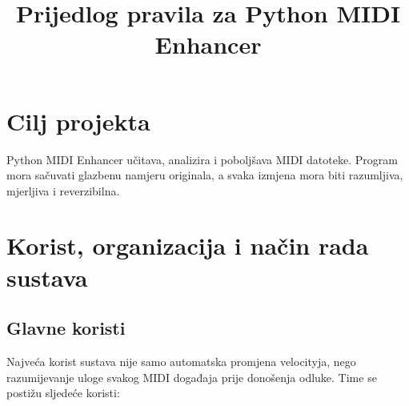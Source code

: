 \documentclass[11pt]{article}
\title{Prijedlog pravila za Python MIDI Enhancer}
\author{}
\date{}
\begin{document}
\maketitle

\section{Cilj projekta}

Python MIDI Enhancer učitava, analizira i poboljšava MIDI datoteke. Program mora
sačuvati glazbenu namjeru originala, a svaka izmjena mora biti razumljiva,
mjerljiva i reverzibilna.

\section{Korist, organizacija i način rada sustava}

\subsection{Glavne koristi}

Najveća korist sustava nije samo automatska promjena velocityja, nego
razumijevanje uloge svakog MIDI događaja prije donošenja odluke. Time se
postižu sljedeće koristi:
\end{document}
